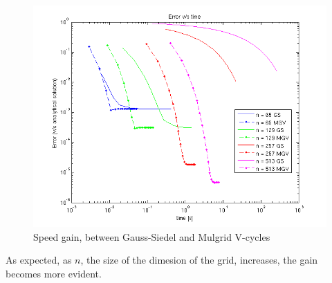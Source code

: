 \documentclass{article}
\numberwithin{equation}{section}
\begin{document}
    \begin{figure}[!htbp]
        \centering
        \includegraphics[width=15cm]{./p-set1/inform-5.png}
        \caption{Speed gain, between Gauss-Siedel and Mulgrid V-cycles}
    \end{figure}

    As expected, as $n$, the size of the dimesion of the grid, increases, the gain becomes more evident.
\end{document}
